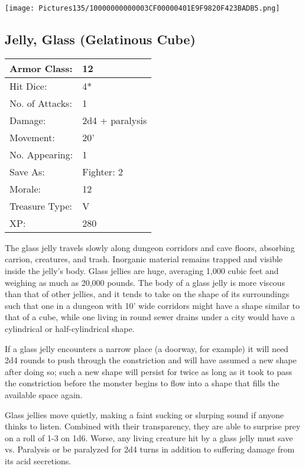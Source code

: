 \documentclass[a4paper,twoside,openany,10pt]{book}
\begin{document}
\begin{multicols}{2}
\begin{center} \texttt{[image: Pictures135/10000000000003CF00000401E9F9820F423BADB5.png]} \end{center}

\subsection*{Jelly, Glass (Gelatinous Cube)}\label{jelly-glass-gelatinous-cube}

\begin{tabularx}{0.50\textwidth}{@{}lX@{}}
Armor Class: & 12 \\\hline
Hit Dice: & 4* \\\hline
No. of Attacks: & 1 \\\hline
Damage: & 2d4 + paralysis \\\hline
Movement: & 20' \\\hline
No. Appearing: & 1 \\\hline
Save As: & Fighter: 2 \\\hline
Morale: & 12 \\\hline
Treasure Type: & V \\\hline
XP: & 280 \\\hline
\end{tabularx}

The
glass jelly travels slowly along dungeon corridors and cave floors, absorbing carrion, creatures, and trash. Inorganic material remains trapped and visible inside the jelly's body. Glass jellies are huge, averaging 1,000 cubic feet and weighing as much as 20,000 pounds. The body of a glass jelly is more viscous than that of other jellies, and it tends to take on the shape of its surroundings such that one in a dungeon with 10' wide corridors might have a shape similar to that of a cube, while one living in round sewer drains under a city would have a cylindrical or half-cylindrical shape.

If a glass jelly encounters a narrow place (a doorway, for example) it will need 2d4 rounds to push through the constriction and will have assumed a new shape after doing so; such a new shape will persist for twice as long as it took to pass the constriction before the monster begins to flow into a shape that fills the available space again. 

Glass jellies move quietly, making a faint sucking or slurping sound if anyone thinks to listen. Combined with their transparency, they are able to surprise prey on a roll of 1-3 on 1d6. Worse, any living creature hit by a glass jelly must save vs. Paralysis or be paralyzed for 2d4 turns in addition to suffering damage from its acid secretions.


\end{multicols}
\end{document}

